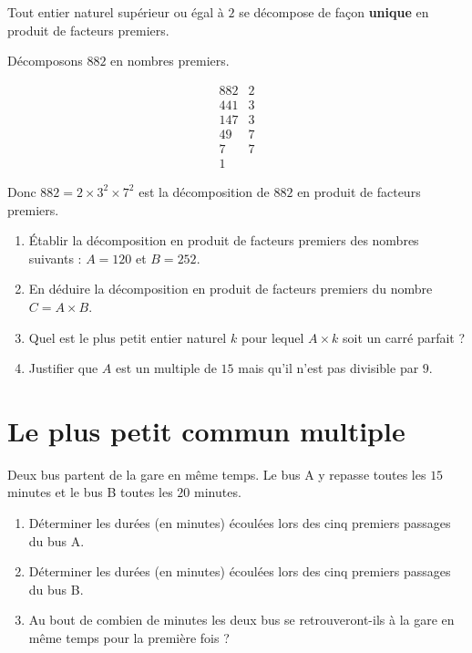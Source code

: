 \documentclass[10pt, a4paper]{article}
\begin{document}
\begin{Theoreme}

Tout entier naturel supérieur ou égal à $2$ se décompose de façon \textbf{unique} en produit
de facteurs premiers.
\end{Theoreme}

\begin{Exemple}[][5 min]
Décomposons $882$ en nombres premiers.

$$
\begin{array}{r|l}
882 & 2 \\
441 & 3 \\
147 & 3 \\
49 & 7 \\
7 & 7 \\
1 &
\end{array}
$$

Donc $882 = 2 \times 3^2 \times 7^2$ est la décomposition de $882$ en produit de facteurs premiers.
\end{Exemple}

\begin{Application}[][20 min]
\begin{enumerate}[leftmargin=*,itemsep=0.5pt]
    \item Établir la décomposition en produit de facteurs premiers des nombres suivants : $A = 120$ et $B = 252$.

    \item En déduire la décomposition en produit de facteurs premiers du nombre $C = A \times B$.

    \item Quel est le plus petit entier naturel $k$ pour lequel $A \times k$ soit un carré parfait ?

    \item Justifier que $A$ est un multiple de $15$ mais qu'il n'est pas divisible par $9$.
\end{enumerate}
\end{Application}



\section{Le plus petit commun multiple }


\begin{Activite}[][10 min]
Deux bus partent de la gare en même temps.
Le bus A y repasse toutes les $15$ minutes et le bus B toutes les $20$ minutes.

\begin{enumerate}[leftmargin=*,itemsep=0.5pt]
    \item Déterminer les durées (en minutes) écoulées lors des cinq premiers passages du bus A.
    \item Déterminer les durées (en minutes) écoulées lors des cinq premiers passages du bus B.
    \item Au bout de combien de minutes les deux bus se retrouveront-ils à la gare en même temps pour la première fois ?
\end{enumerate}
\end{Activite}
\end{document}
